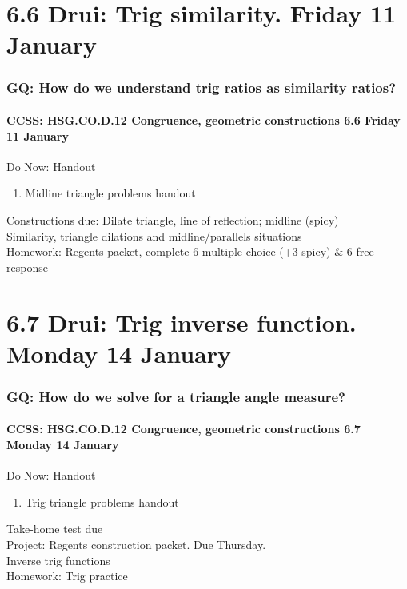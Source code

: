 \documentclass{beamer}
\begin{document}
\section{6.6 Drui: Trig similarity. Friday 11 January}
  \frame
  {
    \frametitle{GQ: How do we understand trig ratios as similarity ratios?}
    \framesubtitle{CCSS: HSG.CO.D.12 Congruence, geometric constructions  \alert{6.6 Friday 11 January}}

    \begin{block}{Do Now: Handout}
      \begin{enumerate}
        \item Midline triangle problems handout
      \end{enumerate}
    \end{block}
    Constructions due: Dilate triangle, line of reflection; midline (spicy) \\[0.5cm]
    Similarity, triangle dilations and midline/parallels situations\\[0.5cm]
    Homework: Regents packet, complete 6 multiple choice (+3 spicy) \& 6 free response
  }

\section{6.7 Drui: Trig inverse function. Monday 14 January}
  \frame
  {
    \frametitle{GQ: How do we solve for a triangle angle measure?}
    \framesubtitle{CCSS: HSG.CO.D.12 Congruence, geometric constructions  \alert{6.7 Monday 14 January}}

    \begin{block}{Do Now: Handout}
      \begin{enumerate}
        \item Trig triangle problems handout
      \end{enumerate}
    \end{block}
    Take-home test due\\
    Project: Regents construction packet. Due Thursday.\\
    Inverse trig functions\\[0.5cm]
    Homework: Trig practice
  }
\end{document}
